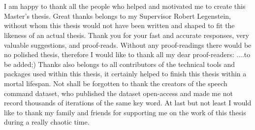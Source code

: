 
\chapter*{}
I am happy to thank all the people who helped and motivated me to create this Master's thesis.
Great thanks belongs to my Supervisor Robert Legenstein, without whom this thesis would not have been written and shaped to fit the likeness of an actual thesis.
Thank you for your fast and accurate responses, very valuable suggestions, and proof-reads.
Without any proof-readings there would be no polished thesis, therefore I would like to thank all my dear proof-readers: ....to be added;)
Thanks also belongs to all contributors of the technical tools and packages used within this thesis, it certainly helped to finish this thesis within a mortal lifespan.
Not shall be forgotten to thank the creators of the speech command dataset, who published the dataset open-access and made me not record thousands of iterations of the same key word.
At last but not least I would like to thank my family and friends for supporting me on the work of this thesis during a really chaotic time.